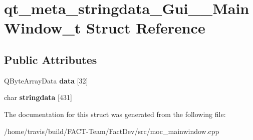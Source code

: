 \hypertarget{structqt__meta__stringdata__Gui____MainWindow__t}{\section{qt\-\_\-meta\-\_\-stringdata\-\_\-\-Gui\-\_\-\-\_\-\-Main\-Window\-\_\-t Struct Reference}
\label{structqt__meta__stringdata__Gui____MainWindow__t}
}
\subsection*{Public Attributes}
\begin{DoxyCompactItemize}
\item 
\hypertarget{structqt__meta__stringdata__Gui____MainWindow__t_a410bae88c735c180f7e421f3fee84870}{Q\-Byte\-Array\-Data {\bfseries data} \mbox{[}32\mbox{]}}\label{structqt__meta__stringdata__Gui____MainWindow__t_a410bae88c735c180f7e421f3fee84870}

\item 
\hypertarget{structqt__meta__stringdata__Gui____MainWindow__t_a6300ca74de011ab047c8a3163af7aeef}{char {\bfseries stringdata} \mbox{[}431\mbox{]}}\label{structqt__meta__stringdata__Gui____MainWindow__t_a6300ca74de011ab047c8a3163af7aeef}

\end{DoxyCompactItemize}


The documentation for this struct was generated from the following file\-:\begin{DoxyCompactItemize}
\item 
/home/travis/build/\-F\-A\-C\-T-\/\-Team/\-Fact\-Dev/src/moc\-\_\-mainwindow.\-cpp\end{DoxyCompactItemize}
